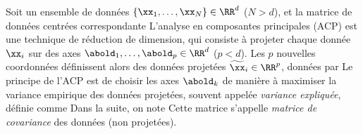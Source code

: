 \documentclass[11pt]{article}
\begin{document}
Soit un ensemble de données $\{\xx_1,\ldots, \xx_N\} \in \RR^d$ ($N > d$), et la matrice de données centrées correspondante
L'analyse en composantes principales (ACP) est une technique de réduction de dimension, qui consiste à projeter chaque donnée $\xx_i$ sur des axes $\abold_1, \ldots, \abold_p \in \RR^d$ ($p < d$). Les $p$ nouvelles coordonnées définissent alors des données projetées $\widetilde{\xx}_i \in \RR^p$, données par
Le principe de l'ACP est de choisir les axes $\abold_k$ de manière à maximiser la variance empirique des données projetées, souvent appelée \textit{variance expliquée}, définie comme
Dans la suite, on note
Cette matrice s'appelle \textit{matrice de covariance} des données (non projetées).

 

\end{document}
